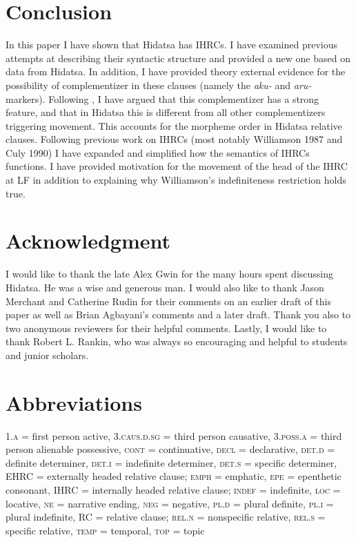 \documentclass[output=paper]{LSP/langsci}
\begin{document}
\section{Conclusion} 

In this paper I have shown that Hidatsa has IHRCs. I have examined previous attempts at describing their syntactic structure and provided a new one based on data from Hidatsa. In addition, I have provided theory external evidence for the possibility of complementizer in these clauses (namely the \textit{aku-} and \textit{aru-} markers). Following \citet{Culy1990}, I have argued that this complementizer has a strong feature, and that in Hidatsa this is different from all other complementizers triggering movement. This accounts for the morpheme order in Hidatsa relative clauses.  Following previous work on IHRCs (most notably Williamson 1987 and Culy 1990) I have expanded and simplified how the semantics of IHRCs functions. I have provided motivation for the movement of the head of the IHRC at LF in addition to explaining why Williamson's indefiniteness restriction holds true.

\section*{Acknowledgment}

I would like to thank the late Alex Gwin for the many hours spent discussing Hidatsa. He was a wise and generous man. I would also like to thank Jason Merchant and Catherine Rudin for their comments on an earlier draft of this paper as well as Brian Agbayani's comments and a later draft. Thank you also to two anonymous reviewers for their helpful comments. Lastly, I would like to thank Robert L. Rankin, who was always so encouraging and helpful to students and junior scholars.

\section*{Abbreviations}

\textsc{1.a} = first person active, \textsc{3.caus.d.sg} = third person causative, \textsc{3.poss.a} = third person alienable possessive, \textsc{cont} = continuative, \textsc{decl} = declarative, \textsc{det.d} = definite determiner, \textsc{det.i} = indefinite determiner, \textsc{det.s} = specific determiner, EHRC = externally headed relative clause; \textsc{emph} = emphatic, \textsc{epe} = epenthetic consonant, IHRC = internally headed relative clause; \textsc{indef} = indefinite, \textsc{loc} = locative, \textsc{ne} = narrative ending, \textsc{neg} = negative, \textsc{pl.d} = plural definite, \textsc{pl.i} = plural indefinite, RC = relative clause; \textsc{rel.n} = nonspecific relative, \textsc{rel.s} = specific relative, \textsc{temp} = temporal, \textsc{top} = topic
\end{document}
